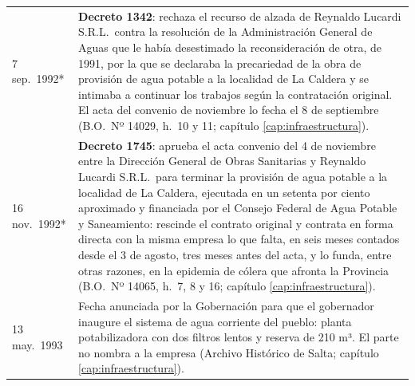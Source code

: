\begin{longtable}{@{}p{2.7cm}p{10.3cm}@{}}
7 sep.\ 1992* & \textbf{Decreto 1342}: rechaza el recurso de alzada de Reynaldo Lucardi S.R.L.\ contra la resolución de la Administración General de Aguas que le había desestimado la reconsideración de otra, de 1991, por la que se declaraba la precariedad de la obra de provisión de agua potable a la localidad de La Caldera y se intimaba a continuar los trabajos según la contratación original. El acta del convenio de noviembre lo fecha el 8 de septiembre (B.O.\ Nº 14029, h.\ 10 y 11; capítulo \ref{cap:infraestructura}). \\
16 nov.\ 1992* & \textbf{Decreto 1745}: aprueba el acta convenio del 4 de noviembre entre la Dirección General de Obras Sanitarias y Reynaldo Lucardi S.R.L.\ para terminar la provisión de agua potable a la localidad de La Caldera, ejecutada en un setenta por ciento aproximado y financiada por el Consejo Federal de Agua Potable y Saneamiento: rescinde el contrato original y contrata en forma directa con la misma empresa lo que falta, en seis meses contados desde el 3 de agosto, tres meses antes del acta, y lo funda, entre otras razones, en la epidemia de cólera que afronta la Provincia (B.O.\ Nº 14065, h.\ 7, 8 y 16; capítulo \ref{cap:infraestructura}). \\
13 may.\ 1993 & Fecha anunciada por la Gobernación para que el gobernador inaugure el sistema de agua corriente del pueblo: planta potabilizadora con dos filtros lentos y reserva de 210 m³. El parte no nombra a la empresa (Archivo Histórico de Salta; capítulo \ref{cap:infraestructura}). \\

\end{longtable}
